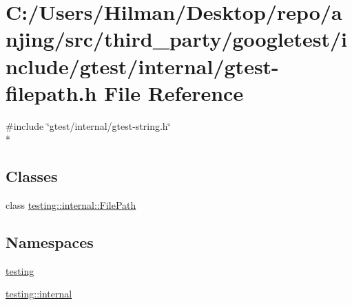 \hypertarget{gtest-filepath_8h}{}\section{C\+:/\+Users/\+Hilman/\+Desktop/repo/anjing/src/third\+\_\+party/googletest/include/gtest/internal/gtest-\/filepath.h File Reference}
\label{gtest-filepath_8h}
{\ttfamily \#include \char`\"{}gtest/internal/gtest-\/string.\+h\char`\"{}}\\*
\subsection*{Classes}
\begin{DoxyCompactItemize}
\item 
class \hyperlink{classtesting_1_1internal_1_1_file_path}{testing\+::internal\+::\+File\+Path}
\end{DoxyCompactItemize}
\subsection*{Namespaces}
\begin{DoxyCompactItemize}
\item 
 \hyperlink{namespacetesting}{testing}
\item 
 \hyperlink{namespacetesting_1_1internal}{testing\+::internal}
\end{DoxyCompactItemize}
